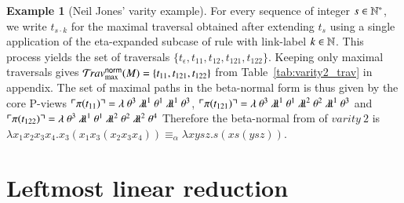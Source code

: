 \documentclass{elsarticle}
\theoremstyle{plain}
\theoremstyle{definition}
\newtheorem{example}{Example}[section]
\theoremstyle{remark}
\newcommand{\ghostlmd}{{\lambda\!\!\lambda}}
\newcommand{\ghostvar}{\theta}
\newcommand{\normalizing}{{\sf norm}}
\newcommand{\travsetnorm}{\travset^\normalizing}
\def\coresymbol{\pi} %
\newcommand{\core}[1]{\coresymbol(#1)} %
\begin{document}
\begin{example}[Neil Jones' varity example]
For every sequence of integer $s \in \mathbb{N}^*$, we write $t_{s \cdot k}$ for the maximal traversal obtained after extending $t_s$ using a single application of the eta-expanded subcase of rule  with link-label $k \in \mathbb{N}$. This process yields the set of traversals $\{t_\epsilon, t_{11}, t_{12}, t_{121}, t_{122} \}$. Keeping only maximal traversals gives $\travsetnorm_{\max}(M) = \{ t_{11}, t_{121}, t_{122} \}$ from Table~\ref{tab:varity2_trav} in appendix. The set of maximal paths in the beta-normal form is thus given by the core P-views
$\pview{\core{t_{11}}} =
        \lambda \ \ghostvar^{3}\ \ghostlmd^{1}\
        \ghostvar^{1}\ \ghostlmd^{1}\ \ghostvar^{3}
$,
$\pview{\core{t_{121}}} =
        \lambda \ \ghostvar^{3}\ \ghostlmd^{1}\ \ghostvar^{1}\ \ghostlmd^{2}\ \ghostvar^{2}\ \ghostlmd^{1}\ \ghostvar^{3}$
and
$\pview{\core{t_{122}}} =
    \lambda \ \ghostvar^{3}\ \ghostlmd^{1}\ \ghostvar^{1}\ \ghostlmd^{2}\ \ghostvar^{2}\ \ghostlmd^{2}\ \ghostvar^{4}$
Therefore the beta-normal from of $varity\ 2$ is
$\lambda x_1 x_2 x_3 x_4 . x_3 (x_1 x_3 (x_2 x_3 x_4)) \equiv_\alpha \lambda x y s z . s (x s (y s z))
$.
\end{example}


\section{Leftmost linear reduction}
\label{sec:leftmostlinearred}
\end{document}
